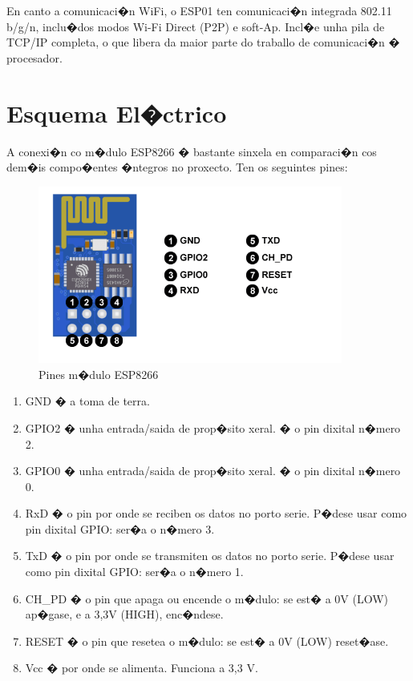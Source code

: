 \documentclass[11pt,twoside]{book}
\begin{document}
En canto a comunicaci�n WiFi, o ESP01 ten comunicaci�n integrada 802.11  b/g/n, inclu�dos modos  Wi-Fi  Direct (P2P) e  soft-Ap. Incl�e unha pila de  TCP/IP completa, o que libera da maior parte do traballo de comunicaci�n � procesador.

\section{Esquema El�ctrico}

A conexi�n co m�dulo ESP8266 � bastante sinxela en comparaci�n cos dem�is compo�entes �ntegros no proxecto. Ten os seguintes pines:

\begin{figure}[H]
	\begin{center}
		\includegraphics[width=10cm]{images/pines-esp01.png}
	\end{center}
	\caption{Pines m�dulo ESP8266}
	\label{fig:PinesESP8266}
\end{figure}

\begin{enumerate}
\item GND � a toma de terra.
\item GPIO2 � unha entrada/saida de prop�sito xeral. � o pin dixital n�mero 2.
\item GPIO0 � unha entrada/saida de prop�sito xeral. � o pin dixital n�mero 0.
\item RxD � o pin por onde se reciben os datos no porto serie. P�dese usar como pin dixital GPIO: ser�a o n�mero 3.
\item TxD � o pin por onde se transmiten os datos no porto serie. P�dese usar como pin dixital GPIO: ser�a o n�mero 1.
\item CH\_PD � o pin que apaga ou encende o m�dulo: se est� a 0V (LOW) ap�gase, e a 3,3V (HIGH), enc�ndese.
\item RESET � o pin que resetea o m�dulo: se est� a 0V (LOW) reset�ase.
\item Vcc � por onde se alimenta. Funciona a 3,3 V.
\end{enumerate}
\end{document}
